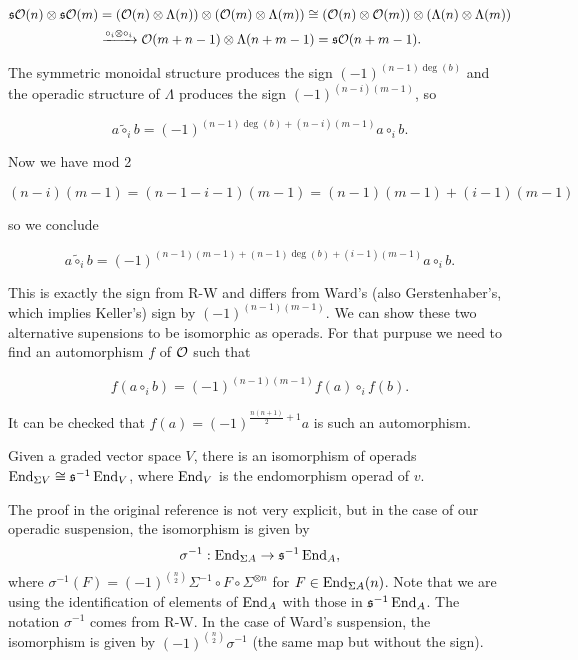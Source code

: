 \documentclass[twoside]{article}
\begin{document}
\begin{align*}
\mathfrak{s}{\mathcal O}(n)\otimes\mathfrak{s}{\mathcal O}(m)&=({\mathcal O}(n)\otimes\Lambda(n))\otimes ({\mathcal O}(m)\otimes\Lambda(m))\cong ({\mathcal O}(n)\otimes {\mathcal O}(m))\otimes (\Lambda(n)\otimes \Lambda(m))\\
&\xrightarrow{\circ_i\otimes\circ_i} {\mathcal O}(m+n-1)\otimes \Lambda(n+m-1)=\mathfrak{s}{\mathcal O}(n+m-1).
\end{align*}

The symmetric monoidal structure produces the sign $(-1)^{(n-1)\deg(b)}$ and the operadic structure of $\Lambda$ produces the sign $(-1)^{(n-i)(m-1)}$, so 

$$a\tilde{\circ}_ib=(-1)^{(n-1)\deg(b)+(n-i)(m-1)}a\circ_i b.$$

Now we have mod 2

$$(n-i)(m-1)=(n-1-i-1)(m-1)=(n-1)(m-1)+(i-1)(m-1)$$

so we conclude 

$$a\tilde{\circ}_ib=(-1)^{(n-1)(m-1)+(n-1)\deg(b)+(i-1)(m-1)}a\circ_i b.$$

This is exactly the sign from R-W and differs from Ward's (also Gerstenhaber's, which implies Keller's) sign by $(-1)^{(n-1)(m-1)}$. We can show these two alternative supensions to be isomorphic as operads. For that purpuse we need to find an automorphism $f$ of ${\mathcal O}$ such that 

$$f(a\circ_i b)=(-1)^{(n-1)(m-1)}f(a)\circ_i f(b).$$

It can be checked that $f(a)=(-1)^{\frac{n(n+1)}{2}+1}a$ is such an automorphism.

\begin{theorem}
Given a graded vector space $V$, there is an isomorphism of operads $\operatorname{End}_{\Sigma V}\cong \mathfrak{s}^{-1}\operatorname{End}_V$, where $\operatorname{End}_V$ is the endomorphism operad of $v$.
\end{theorem}
The proof in the original reference is not very explicit, but in the case of our operadic suspension, the isomorphism is given by $$\sigma^{-1}:\operatorname{End}_{\Sigma A}\to\mathfrak{s}^{-1}\operatorname{End}_A,$$ where $\sigma^{-1}(F)=(-1)^{\binom{n}{2}}\Sigma^{-1}\circ F\circ \Sigma^{\otimes n}$ for $F\in \operatorname{End}_{\Sigma A}(n)$. %
Note that we are using the identification of elements of $\operatorname{End}_A$ with those in $\mathfrak{s}^{-1}\operatorname{End}_A$. The notation $\sigma^{-1}$ comes from R-W. In the case of Ward's suspension, the isomorphism is given by $(-1)^{\binom{n}{2}}\sigma^{-1}$ (the same map but without the sign).
\end{document}
